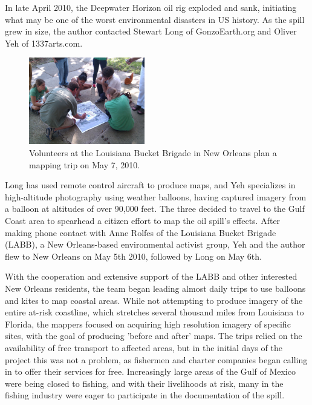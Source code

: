\documentclass[11pt]{report}
\begin{document}
In late April 2010, the Deepwater Horizon oil rig exploded and sank, initiating what may be one of the worst environmental disasters in US history. As the spill grew in size, the author contacted Stewart Long of GonzoEarth.org and Oliver Yeh of 1337arts.com. \begin{figure}
	\begin{flushright}
		\includegraphics[width=0.45\textwidth]{images/labb-planning.jpg}
		\caption{Volunteers at the Louisiana Bucket Brigade in New Orleans plan a mapping trip on May 7, 2010.}
	\end{flushright}
\end{figure}Long has used remote control aircraft to produce maps, and Yeh specializes in high-altitude photography using weather balloons, having captured imagery from a balloon at altitudes of over 90,000 feet. The three decided to travel to the Gulf Coast area to spearhead a citizen effort to map the oil spill's effects. After making phone contact with Anne Rolfes of the Louisiana Bucket Brigade (LABB), a New Orleans-based environmental activist group, Yeh and the author flew to New Orleans on May 5th 2010, followed by Long on May 6th. 

With the cooperation and extensive support of the LABB and other interested New Orleans residents, the team began leading almost daily trips to use balloons and kites to map coastal areas. While not attempting to produce imagery of the entire at-risk coastline, which stretches several thousand miles from Louisiana to Florida, the mappers focused on acquiring high resolution imagery of specific sites, with the goal of producing 'before and after' maps. The trips relied on the availability of free transport to affected areas, but in the initial days of the project this was not a problem, as fishermen and charter companies began calling in to offer their services for free. Increasingly large areas of the Gulf of Mexico were being closed to fishing, and with their livelihoods at risk, many in the fishing industry were eager to participate in the documentation of the spill. 
\end{document}
